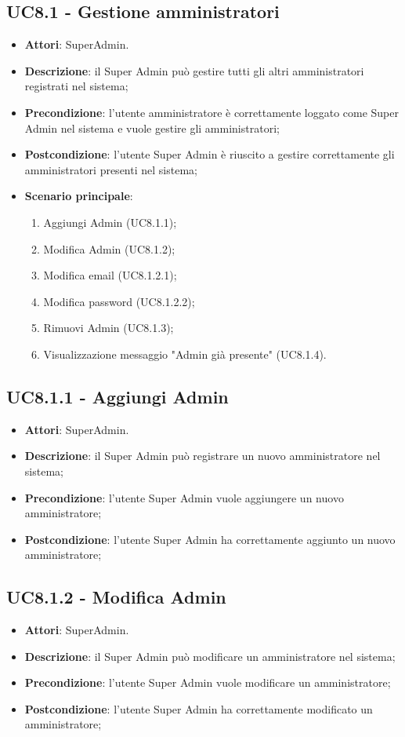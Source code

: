 \documentclass[../AnalisiDeiRequisiti.tex]{subfiles}
\begin{document}
\subsection{UC8.1 - Gestione amministratori} 
\label{sssec:UC8.1} 
\begin{itemize} 
\item \textbf{Attori}: SuperAdmin.
\item \textbf{Descrizione}: il Super Admin può gestire tutti gli altri amministratori registrati nel sistema;
\item \textbf{Precondizione}: l'utente amministratore è correttamente loggato come Super Admin nel sistema e vuole gestire gli amministratori;
\item \textbf{Postcondizione}: l'utente Super Admin è riuscito a gestire correttamente gli amministratori presenti nel sistema;
\item \textbf{Scenario principale}: \begin{enumerate}\item Aggiungi Admin (UC8.1.1);\item Modifica Admin (UC8.1.2);\item Modifica email (UC8.1.2.1);\item Modifica password (UC8.1.2.2);\item Rimuovi Admin (UC8.1.3);\item Visualizzazione messaggio "Admin già presente" (UC8.1.4). 
 \end{enumerate}
\end{itemize} 
\subsection{UC8.1.1 - Aggiungi Admin} 
\label{sssec:UC8.1.1} 
\begin{itemize} 
\item \textbf{Attori}: SuperAdmin.
\item \textbf{Descrizione}: il Super Admin può registrare un nuovo amministratore nel sistema;
\item \textbf{Precondizione}: l'utente Super Admin vuole aggiungere un nuovo amministratore;
\item \textbf{Postcondizione}: l'utente Super Admin ha correttamente  aggiunto un nuovo amministratore;
\end{itemize} 
\subsection{UC8.1.2 - Modifica Admin} 
\label{sssec:UC8.1.2} 
\begin{itemize} 
\item \textbf{Attori}: SuperAdmin.
\item \textbf{Descrizione}: il Super Admin può modificare un amministratore nel sistema;
\item \textbf{Precondizione}: l'utente Super Admin vuole modificare un amministratore;
\item \textbf{Postcondizione}: l'utente Super Admin ha correttamente  modificato un amministratore;
\end{itemize} 
\end{document}
